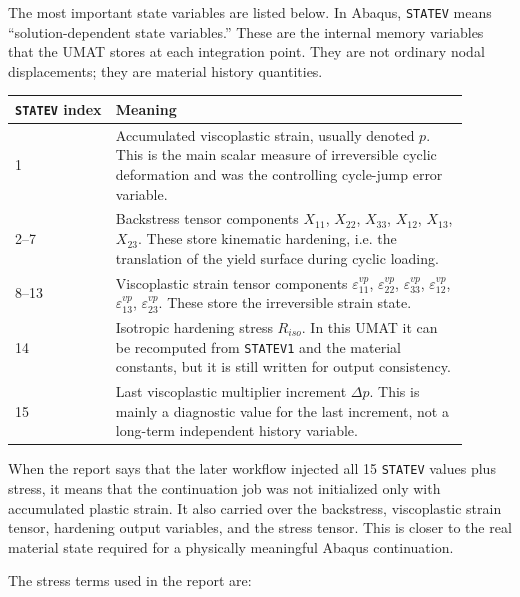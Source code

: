 \documentclass[11pt,a4paper]{article}
\begin{document}
The most important state variables are listed below. In Abaqus, \texttt{STATEV} means ``solution-dependent state variables.'' These are the internal memory variables that the UMAT stores at each integration point. They are not ordinary nodal displacements; they are material history quantities.

\begin{center}
\begin{tabular}{p{0.20\linewidth}p{0.70\linewidth}}
\toprule
\texttt{STATEV} index & Meaning \\
\midrule
1 & Accumulated viscoplastic strain, usually denoted $p$. This is the main scalar measure of irreversible cyclic deformation and was the controlling cycle-jump error variable. \\
2--7 & Backstress tensor components $X_{11}$, $X_{22}$, $X_{33}$, $X_{12}$, $X_{13}$, $X_{23}$. These store kinematic hardening, i.e. the translation of the yield surface during cyclic loading. \\
8--13 & Viscoplastic strain tensor components $\varepsilon^{vp}_{11}$, $\varepsilon^{vp}_{22}$, $\varepsilon^{vp}_{33}$, $\varepsilon^{vp}_{12}$, $\varepsilon^{vp}_{13}$, $\varepsilon^{vp}_{23}$. These store the irreversible strain state. \\
14 & Isotropic hardening stress $R_{iso}$. In this UMAT it can be recomputed from \texttt{STATEV1} and the material constants, but it is still written for output consistency. \\
15 & Last viscoplastic multiplier increment $\Delta p$. This is mainly a diagnostic value for the last increment, not a long-term independent history variable. \\
\bottomrule
\end{tabular}
\end{center}

When the report says that the later workflow injected all 15 \texttt{STATEV} values plus stress, it means that the continuation job was not initialized only with accumulated plastic strain. It also carried over the backstress, viscoplastic strain tensor, hardening output variables, and the stress tensor. This is closer to the real material state required for a physically meaningful Abaqus continuation.

The stress terms used in the report are:
\end{document}
